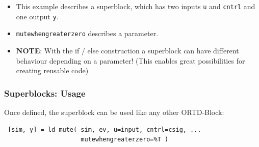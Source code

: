\documentclass[serif,9pt,xcolor=dvipsnames]{beamer}
\begin{document}
\begin{frame}[fragile]
%     

\begin{itemize}
 \item This example describes a superblock, which has two inputs \texttt{u} and \texttt{cntrl} and one output \texttt{y}.
\item \texttt{mutewhengreaterzero} describes a parameter.
\item \textbf{NOTE}: With the if / else construction a superblock can have different behaviour depending on a parameter! (This enables great possibilities for creating reusable code)
\end{itemize}


\end{frame}


\begin{frame}[fragile]
 \frametitle{Superblocks: Usage}
 
  Once defined, the superblock can be used like any other ORTD-Block:

\vspace{1.5cm}
 
 {\small 
\begin{lstlisting} 
 [sim, y] = ld_mute( sim, ev, u=input, cntrl=csig, ...
                     mutewhengreaterzero=%T ) 
\end{lstlisting}}

\end{frame}
\end{document}
